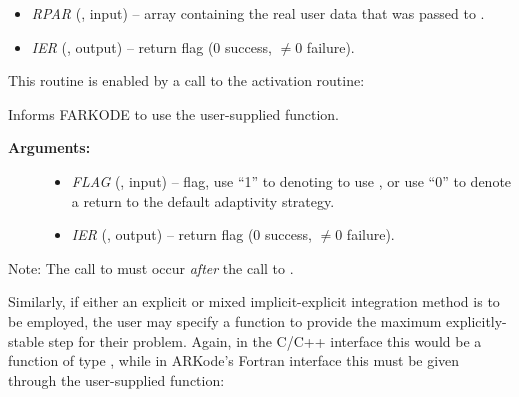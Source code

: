 \documentclass[letterpaper,10pt,english]{sphinxmanual}
\begin{document}
\begin{fulllineitems}
\begin{description}
\begin{itemize}
\item {} 
\emph{RPAR} (, input) -- array containing the real user
data that was passed to {\hyperref[f_interface/Usage:f/_/FARKMALLOC]{}}.

\item {} 
\emph{IER} (, output) -- return flag (0 success, $\ne 0$ failure).

\end{itemize}

\end{description}

\end{fulllineitems}


This routine is enabled by a call to the activation routine:

\begin{fulllineitems}
\label{f_interface/Usage:f/_/FARKADAPTSET}
Informs FARKODE to use the user-supplied {\hyperref[f_interface/Usage:f/_/FARKADAPT]{}} function.
\begin{description}
\item[{\textbf{Arguments:}}] \leavevmode\begin{itemize}
\item {} 
\emph{FLAG} (, input) -- flag, use ``1'' to denoting to use
{\hyperref[f_interface/Usage:f/_/FARKADAPT]{}}, or use ``0'' to denote a return to the
default adaptivity strategy.

\item {} 
\emph{IER} (, output) -- return flag (0 success, $\ne
0$ failure).

\end{itemize}

\end{description}

Note: The call to {\hyperref[f_interface/Usage:f/_/FARKADAPTSET]{}} must occur \emph{after} the call
to {\hyperref[f_interface/Usage:f/_/FARKMALLOC]{}}.

\end{fulllineitems}


Similarly, if either an explicit or mixed implicit-explicit
integration method is to be employed, the user may specify a function
to provide the maximum explicitly-stable step for their problem.
Again, in the C/C++ interface this would be a function of type
{\hyperref[c_interface/User_supplied:ARKExpStabFn]{}}, while in ARKode's Fortran interface this
must be given through the user-supplied function:
\end{document}
